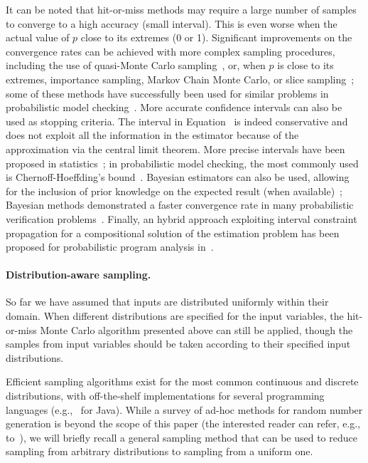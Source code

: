 It can be noted that hit-or-miss methods may require a large number of samples to converge to a high accuracy (small interval). This is even worse when the actual value of $p$ close to its extremes (0 or 1). Significant improvements on the convergence rates can be achieved with more complex sampling procedures, including the use of quasi-Monte Carlo sampling~\cite{robert2013monte}, or, when $p$ is close to its extremes, importance sampling, Markov Chain Monte Carlo, or slice sampling~\cite{bishop2006pattern}; some of these methods have successfully been used for similar problems in probabilistic model checking~\cite{importanceSamplingSMC,splittingSMC,statisticalModelChecking}. More accurate confidence intervals can also be used as stopping criteria. The interval in Equation~\cite{eq:mleInterval} is indeed conservative and does not exploit all the information in the estimator because of the approximation via the central limit theorem. More precise intervals have been proposed in statistics~\cite{pestman1998mathematical}; in probabilistic model checking, the most commonly used is Chernoff-Hoeffding's bound~\cite{hoeffding1963probability,approximatePMC,statisticalModelChecking}. Bayesian estimators can also be used, allowing for the inclusion of prior knowledge on the expected result (when available)~\cite{Robert2007BayesianChoice,gelman2003bayesian}; Bayesian methods demonstrated a faster convergence rate in many probabilistic verification problems~\cite{Zuliani:2010:BSM:1755952.1755987}. Finally, an hybrid approach exploiting interval constraint propagation for a compositional solution of the estimation problem has been proposed for probabilistic program analysis in~\cite{Borges2014,2015-fse-qcoral}.

\paragraph{Distribution-aware sampling.} So far we have assumed that inputs are distributed uniformly within their domain. When different distributions are specified for the input variables, the hit-or-miss Monte Carlo algorithm presented above can still be applied, though the samples from input variables should be taken according to their specified input distributions.

Efficient sampling algorithms exist for the most common continuous and discrete distributions, with off-the-shelf implementations for several programming languages (e.g.,~\cite{commonsMath3} for Java). While a survey of ad-hoc methods for random number generation is beyond the scope of this paper (the interested reader can refer, e.g., to~\cite{gentle2013random}), we will briefly recall a general sampling method that can be used to reduce sampling from arbitrary distributions to sampling from a uniform one. 

